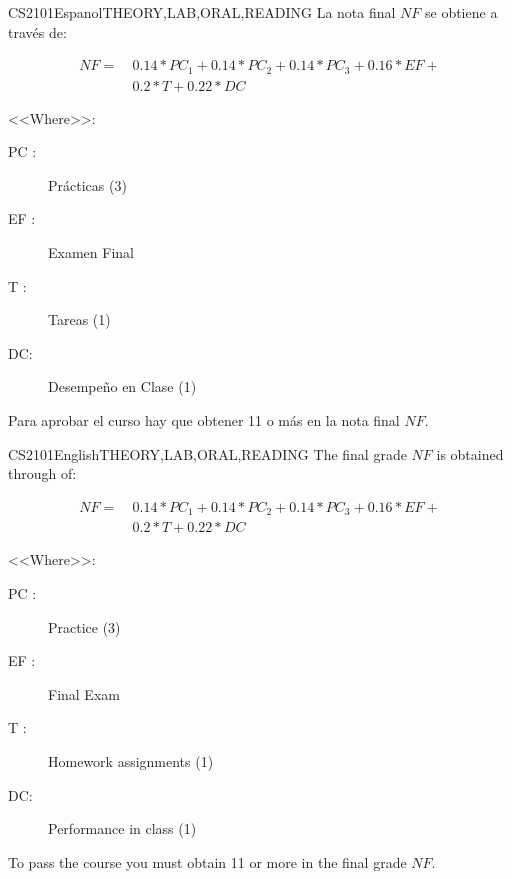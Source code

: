 \begin{evaluation}{CS2101}{Espanol}{THEORY,LAB,ORAL,READING}
La nota final $NF$ se obtiene a través de:

\begin{equation}
   \begin{split}
NF =~   & 0.14* PC_{1} + 0.14* PC_{2} + 0.14*PC_{3} + 0.16*EF + \\
            		&  0.2*T + 0.22*DC
   \end{split}
\end{equation}

\noindent <<Where>>:
\begin{description}
    \item[PC :] Prácticas (3)
    \item[EF :] Examen Final
    \item[T :] Tareas (1)
    \item[DC:] Desempeño en Clase (1)
\end{description}
\noindent Para aprobar el curso hay que obtener 11 o más en la nota final $NF$.
\end{evaluation}

\begin{evaluation}{CS2101}{English}{THEORY,LAB,ORAL,READING}
The final grade $NF$ is obtained through of:

\begin{equation}
   \begin{split}
NF =~   & 0.14* PC_{1} + 0.14* PC_{2} + 0.14*PC_{3} + 0.16*EF + \\
               	&  0.2*T + 0.22*DC
   \end{split}
\end{equation}

\noindent <<Where>>:
\begin{description}
    \item[PC :] Practice (3)
    \item[EF :] Final Exam
    \item[T :] Homework assignments (1)
    \item[DC:] Performance in class (1)
\end{description}
\noindent To pass the course you must obtain 11 or more in the final grade $NF$.
\end{evaluation}

